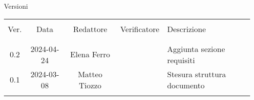 \documentclass[italian,12pt]{article}
\begin{document}


\newpage



\captionsetup[table]{list=no}
\begin{table}[!h]
	\footnotesize
	\begin{center}
		Versioni\\
		\vspace{0.5cm}
		\begin{tabular}{ c c c c p{6.1cm} }
			\hline                                                                         \\[-2ex]
			Ver. & Data       & Redattore     & Verificatore & Descrizione                 \\
			\\[-2ex] \hline \\[-1.5ex]
			0.2  & 2024-04-24 & Elena Ferro   &              & Aggiunta sezione requisiti  \\
			0.1  & 2024-03-08 & Matteo Tiozzo &              & Stesura struttura documento \\
			\\[-1.5ex] \hline
		\end{tabular}
	\end{center}
\end{table}
\captionsetup[table]{list=yes}

\newpage

\tableofcontents
\listoftables

\newpage








\end{document}
